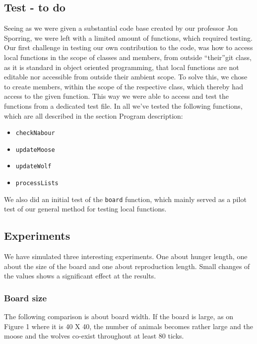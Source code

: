 \documentclass[a4paper]{report}
\begin{document}
\subsection*{Test - to do}

Seeing as we were given a substantial code base created by our professor Jon Sporring, we were left with a limited amount of functions, which required testing.
Our first challenge in testing our own contribution to the code, was how to access local functions in the scope of classes and members, from outside “their”git  class, as it is standard in object oriented programming, that local functions are not editable nor accessible from outside their ambient scope.
To solve this, we chose to create members, within the scope of the respective class, which thereby had access to the given function. This way we were able to access and test the functions from a dedicated test file.
In all we’ve tested the following functions, which are all described in the section Program description:
\begin{itemize}
\item \texttt{checkNabour}
\item \texttt{updateMoose}
\item \texttt{updateWolf}
\item \texttt{processLists}
\end{itemize}

We also did an initial test of the \texttt{board} function, which mainly served as a pilot test of our general method for testing local functions.

\subsection*{Experiments}
We have simulated three interesting experiments. One about hunger length, one about the size of the board and one about reproduction length. Small changes of the values shows a significant effect at the results. 

\subsubsection*{Board size}
The following comparison is about board width. If the board is large, as on Figure 1 where it is 40 X 40, the number of animals becomes rather large and the moose and the wolves co-exist throughout at least 80 ticks. 
\end{document}
